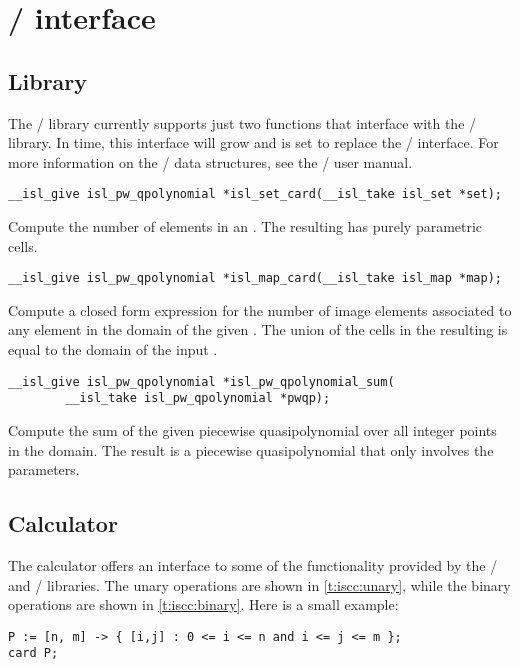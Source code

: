 \section{\protect\isl/ interface}

\subsection{Library}

The \barvinok/ library currently supports just two
functions that interface with the \isl/ library.
In time, this interface will grow and is set to replace
the \PolyLib/ interface.
For more information on the \isl/ data structures, see
the \isl/ user manual.

\begin{verbatim}
__isl_give isl_pw_qpolynomial *isl_set_card(__isl_take isl_set *set);
\end{verbatim}
Compute the number of elements in an .
The resulting  has purely parametric cells.

\begin{verbatim}
__isl_give isl_pw_qpolynomial *isl_map_card(__isl_take isl_map *map);
\end{verbatim}
Compute a closed form expression for the number of image elements
associated to any element in the domain of the given .
The union of the cells in the resulting 
is equal to the domain of the input .

\begin{verbatim}
__isl_give isl_pw_qpolynomial *isl_pw_qpolynomial_sum(
        __isl_take isl_pw_qpolynomial *pwqp);
\end{verbatim}
Compute the sum of the given piecewise quasipolynomial over
all integer points in the domain.  The result is a piecewise
quasipolynomial that only involves the parameters.

\subsection{Calculator}

The  calculator offers an interface to some
of the functionality provided by the \isl/ and \barvinok/
libraries.
The unary operations are shown in \autoref{t:iscc:unary},
while the binary operations are shown in \autoref{t:iscc:binary}.
Here is a small example:
\begin{verbatim}
P := [n, m] -> { [i,j] : 0 <= i <= n and i <= j <= m };
card P;
\end{verbatim}

